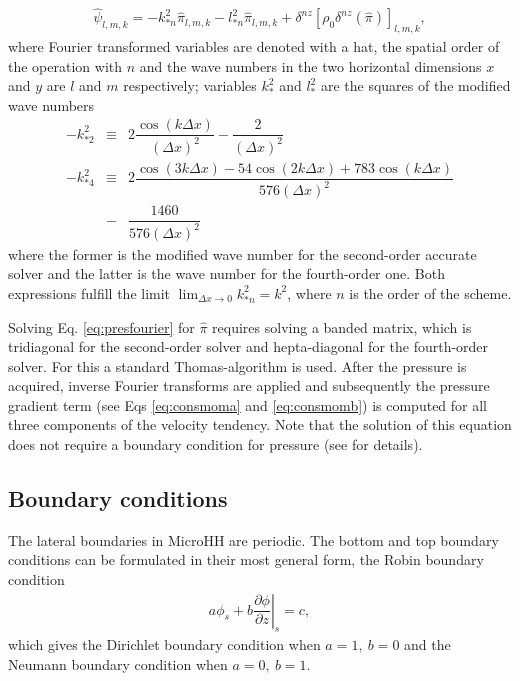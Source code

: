 \documentclass[gmd]{copernicus}
\begin{document}
\begin{eqnarray}
\widehat{\psi}_{l,m,k} = - k^2_{*n} \widehat{\pi}_{l,m,k} - l^2_{*n} \widehat{\pi}_{l,m,k}
+ \delta^{nz} \left[ \rho_0 \delta^{nz} \left( \widehat{\pi} \right) \right]_{l,m,k},\label{eq:presfourier}
\end{eqnarray}
where Fourier transformed variables are denoted with a hat, the spatial order of the operation with $n$ and the wave numbers in the two horizontal dimensions $x$ and $y$ are $l$ and $m$ respectively; variables $k_*^2$ and $l_*^2$ are the squares of the modified wave numbers
\begin{eqnarray}
-k_{*2}^2 & \equiv & 2 \dfrac{\cos (k \Delta x)}{\left( \Delta x \right)^2} - \dfrac{2}{\left( \Delta x \right)^2}\\
\nonumber
-k_{*4}^2 & \equiv & 2 \dfrac{\cos (3k \Delta x) - 54 \cos (2k \Delta x) + 783 \cos (k \Delta x)}
{576 \left( \Delta x \right)^2}\\
& - & \dfrac{1460}{576 \left( \Delta x \right)^2}
\end{eqnarray}
where the former is the modified wave number for the second-order accurate solver and the latter is the wave number for the fourth-order one. Both expressions fulfill the limit
$\lim_{\Delta x \rightarrow 0} k_{*n}^2 = k^2$, where $n$ is the order of the scheme.

Solving Eq. \ref{eq:presfourier} for $\widehat{\pi}$ requires solving a banded matrix, which is tridiagonal for the second-order solver and hepta-diagonal for the fourth-order solver. For this a standard Thomas-algorithm is used. After the pressure is acquired, inverse Fourier transforms are applied and subsequently the pressure gradient term (see Eqs \ref{eq:consmoma} and \ref{eq:consmomb}) is computed for all three components of the velocity tendency. Note that the solution of this equation does not require a boundary condition for pressure (see \citet{Vreman2014} for details).

\subsection{Boundary conditions}
The lateral boundaries in MicroHH are periodic. The bottom and top boundary conditions can be formulated in their most general form, the Robin boundary condition
\begin{eqnarray}
a \phi_s + b \left.\dfrac{\partial \phi}{\partial z}\right|_s = c,
\end{eqnarray}
which gives the Dirichlet boundary condition when ${a=1,~b=0}$ and the Neumann boundary condition when ${a=0,~b=1}$. 
\end{document}
